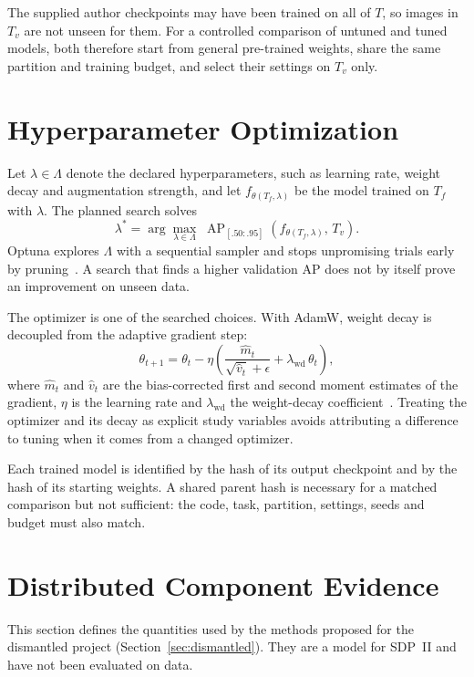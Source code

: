 The supplied author checkpoints may have been trained on all of $T$, so images
in $T_v$ are not unseen for them. For a controlled comparison of untuned and
tuned models, both therefore start from general pre-trained weights, share the
same partition and training budget, and select their settings on $T_v$ only.

\section{Hyperparameter Optimization}\label{sec:optim}
Let $\lambda\in\Lambda$ denote the declared hyperparameters, such as learning
rate, weight decay and augmentation strength, and let $f_{\theta(T_f,\lambda)}$ be
the model trained on $T_f$ with $\lambda$. The planned search solves
\begin{equation}
 \lambda^*=\arg\max_{\lambda\in\Lambda}\;
 \operatorname{AP}_{[.50:.95]}\!\left(f_{\theta(T_f,\lambda)},\,T_v\right).
\end{equation}
Optuna explores $\Lambda$ with a sequential sampler and stops unpromising trials
early by pruning~\citep{akiba2019optuna}. A search that finds a higher validation
AP does not by itself prove an improvement on unseen data.

The optimizer is one of the searched choices. With AdamW, weight decay is
decoupled from the adaptive gradient step:
\begin{equation}
 \theta_{t+1}=\theta_t-\eta\left(\frac{\hat m_t}{\sqrt{\hat v_t}+\epsilon}
 +\lambda_{\text{wd}}\,\theta_t\right),
\end{equation}
where $\hat m_t$ and $\hat v_t$ are the bias-corrected first and second moment
estimates of the gradient, $\eta$ is the learning rate and $\lambda_{\text{wd}}$
the weight-decay coefficient~\citep{loshchilov2019adamw}. Treating the optimizer
and its decay as explicit study variables avoids attributing a difference to
tuning when it comes from a changed optimizer.

Each trained model is identified by the hash of its output checkpoint and by the
hash of its starting weights. A shared parent hash is necessary for a matched
comparison but not sufficient: the code, task, partition, settings, seeds and
budget must also match.

\section{Distributed Component Evidence}\label{sec:distmodel}
This section defines the quantities used by the methods proposed for the dismantled
project (Section~\ref{sec:dismantled}). They are a model for SDP~II and have not been
evaluated on data.

